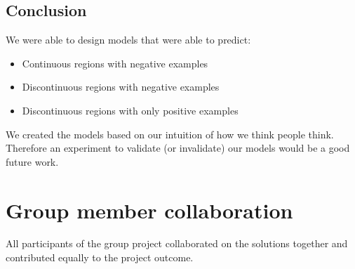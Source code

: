 \documentclass[12pt, ]{scrartcl}
\begin{document}
\begin{multicols}{2}
\section{Conclusion}

We were able to design models that were able to predict:
\begin{itemize}
	\item Continuous regions with negative examples
	\item Discontinuous regions with negative examples
	\item Discontinuous regions with only positive examples 
\end{itemize}

We created the models based on our intuition of how we think people think. Therefore an experiment to validate (or invalidate) our models would be a good future work.


\printbibliography

\if {}
\end{multicols}
\fi

\newpage
\section*{Group member collaboration}
All participants of the group project collaborated on the solutions together and contributed equally to the project outcome. 
\end{document}
